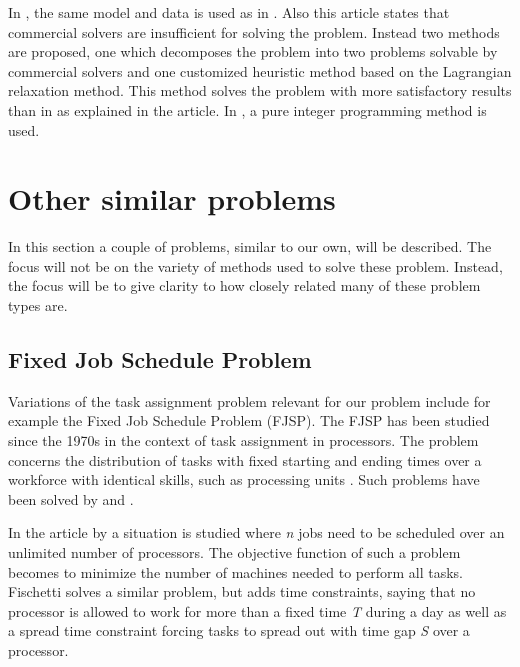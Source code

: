 In \citet{hojati_2011}, the same model and data is used as in \citet{loucks_1991}. Also this article states that commercial solvers are insufficient for solving the problem. Instead two methods are proposed, one which decomposes the problem into two problems solvable by commercial solvers and one customized heuristic method based on the Lagrangian relaxation method. This method solves the problem with more satisfactory results than in \citet{loucks_1991} as explained in the article. In \citet{choi_hwang_park_2009}, a pure integer programming method is used.


\section{Other similar problems}\label{other}
In this section a couple of problems, similar to our own, will be described. The focus will not be on the variety of methods used to solve these problem. Instead, the focus will be to give clarity to how closely related many of these problem types are.
\subsection{Fixed Job Schedule Problem}
Variations of the task assignment problem relevant for our problem include for example the Fixed Job Schedule Problem (FJSP). The FJSP has been studied since the 1970s in the context of task assignment in processors. The problem concerns the distribution of tasks with fixed starting and ending times over a workforce with identical skills, such as processing units \citet{krishnamoorthy_2012}. Such problems have been solved by \citet{gertsbakh_1977} and \citet{fischetti_1992}.

In the article by \citet{gertsbakh_1977} a situation is studied where \textit{n} jobs need to be scheduled over an unlimited number of processors. The objective function of such a problem becomes to minimize the number of machines needed to perform all tasks. Fischetti solves a similar problem, but adds time constraints, saying that no processor is allowed to work for more than a fixed time \textit{T} during a day as well as a spread time constraint forcing tasks to spread out with time gap \textit{S} over a processor.

 	
